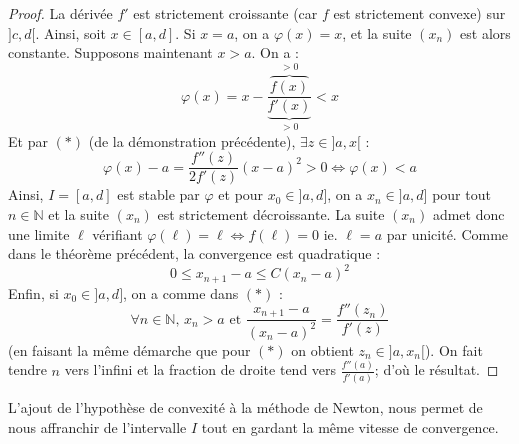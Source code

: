   \begin{proof}
    La dérivée $f'$ est strictement croissante (car $f$ est strictement convexe) sur $]c, d[$. Ainsi, soit $x \in [a, d]$. Si $x = a$, on a $\varphi(x) = x$, et la suite $(x_n)$ est alors constante. Supposons maintenant $x > a$. On a :
    \[ \varphi(x) = x - \frac{\overbrace{f(x)}^{> 0}}{\underbrace{f'(x)}_{> 0}} < x \]
    Et par $(*)$ (de la démonstration précédente), $\exists z \in ]a, x[$ :
    \[ \varphi(x) - a = \frac{f''(z)}{2f'(z)} (x-a)^2 > 0 \iff \varphi(x) < a \]
    Ainsi, $I = [a, d]$ est stable par $\varphi$ et pour $x_0 \in ]a, d]$, on a $x_n \in ]a, d]$ pour tout $n \in \mathbb{N}$ et la suite $(x_n)$ est strictement décroissante. La suite $(x_n)$ admet donc une limite $\ell$ vérifiant $\varphi(\ell) = \ell \iff f(\ell) = 0$ ie. $\ell = a$ par unicité. Comme dans le théorème précédent, la convergence est quadratique :
    \[ 0 \leq x_{n+1} - a \leq C (x_n - a)^2 \]
    Enfin, si $x_0 \in ]a, d]$, on a comme dans $(*)$ :
    \[ \forall n \in \mathbb{N}, \, x_n > a \text{ et } \frac{x_{n+1} - a}{(x_n - a)^2} = \frac{f''(z_n)}{f'(z)} \]
    (en faisant la même démarche que pour $(*)$ on obtient $z_n \in ]a, x_n[$). On fait tendre $n$ vers l'infini et la fraction de droite tend vers $\frac{f''(a)}{f'(a)}$; d'où le résultat.
  \end{proof}

  \begin{remark}
    L'ajout de l'hypothèse de convexité à la méthode de Newton, nous permet de nous affranchir de l'intervalle $I$ tout en gardant la même vitesse de convergence.
  \end{remark}

